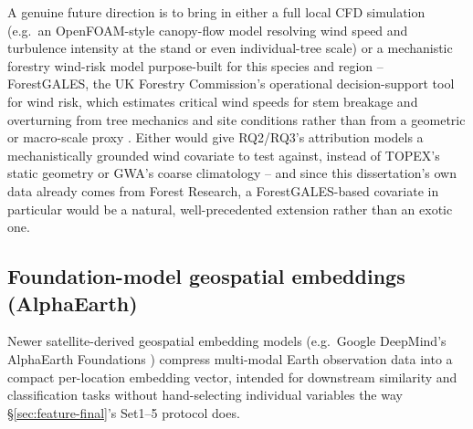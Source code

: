 A genuine future direction is to bring in either a full local CFD simulation (e.g.\ an
OpenFOAM-style canopy-flow model resolving wind speed and turbulence intensity at the stand or
even individual-tree scale) or a mechanistic forestry wind-risk model purpose-built for this
species and region -- ForestGALES, the UK Forestry Commission's operational decision-support tool
for wind risk, which estimates critical wind speeds for stem breakage and overturning from tree
mechanics and site conditions rather than from a geometric or macro-scale proxy . Either would give
RQ2/RQ3's attribution models a mechanistically grounded wind covariate to test against, instead of
TOPEX's static geometry or GWA's coarse climatology -- and since this dissertation's own data
already comes from Forest Research, a ForestGALES-based covariate in particular would be a natural,
well-precedented extension rather than an exotic one.

\subsection{Foundation-model geospatial embeddings (AlphaEarth)}
\label{sec:futurework-alphaearth}

Newer satellite-derived geospatial embedding models (e.g.\ Google DeepMind's AlphaEarth
Foundations ) compress
multi-modal Earth observation data into a compact per-location embedding
vector, intended for downstream similarity and classification tasks without hand-selecting
individual variables the way \S\ref{sec:feature-final}'s Set1--5 protocol does.

